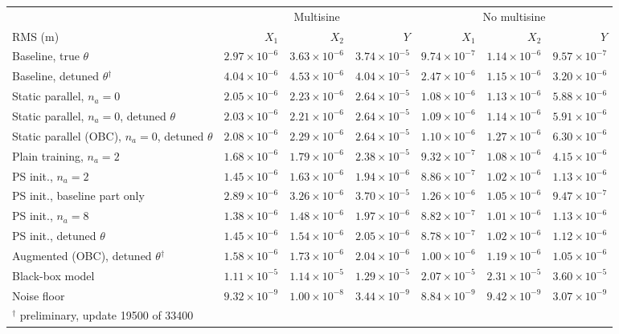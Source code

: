 \setlength{\tabcolsep}{3pt}
\begin{tabular}{l r r r r r r}
\toprule
 & \multicolumn{3}{c}{Multisine} & \multicolumn{3}{c}{No multisine}\\
\cmidrule(lr){2-4}\cmidrule(lr){5-7}
RMS (m) & $X_1$ & $X_2$ & $Y$ & $X_1$ & $X_2$ & $Y$\\
\midrule
Baseline, true $\theta$ & $2.97\times10^{-6}$ & $3.63\times10^{-6}$ & $3.74\times10^{-5}$ & $9.74\times10^{-7}$ & $1.14\times10^{-6}$ & $9.57\times10^{-7}$\\
Baseline, detuned $\theta$$^\dagger$ & $4.04\times10^{-6}$ & $4.53\times10^{-6}$ & $4.04\times10^{-5}$ & $2.47\times10^{-6}$ & $1.15\times10^{-6}$ & $3.20\times10^{-6}$\\
Static parallel, $n_a{=}0$ & $2.05\times10^{-6}$ & $2.23\times10^{-6}$ & $2.64\times10^{-5}$ & $1.08\times10^{-6}$ & $1.13\times10^{-6}$ & $5.88\times10^{-6}$\\
Static parallel, $n_a{=}0$, detuned $\theta$ & $2.03\times10^{-6}$ & $2.21\times10^{-6}$ & $2.64\times10^{-5}$ & $1.09\times10^{-6}$ & $1.14\times10^{-6}$ & $5.91\times10^{-6}$\\
Static parallel (OBC), $n_a{=}0$, detuned $\theta$ & $2.08\times10^{-6}$ & $2.29\times10^{-6}$ & $2.64\times10^{-5}$ & $1.10\times10^{-6}$ & $1.27\times10^{-6}$ & $6.30\times10^{-6}$\\
Plain training, $n_a{=}2$ & $1.68\times10^{-6}$ & $1.79\times10^{-6}$ & $2.38\times10^{-5}$ & $9.32\times10^{-7}$ & $1.08\times10^{-6}$ & $4.15\times10^{-6}$\\
PS init., $n_a{=}2$ & $1.45\times10^{-6}$ & $1.63\times10^{-6}$ & $1.94\times10^{-6}$ & $8.86\times10^{-7}$ & $1.02\times10^{-6}$ & $1.13\times10^{-6}$\\
PS init., baseline part only & $2.89\times10^{-6}$ & $3.26\times10^{-6}$ & $3.70\times10^{-5}$ & $1.26\times10^{-6}$ & $1.05\times10^{-6}$ & $9.47\times10^{-7}$\\
PS init., $n_a{=}8$ & $1.38\times10^{-6}$ & $1.48\times10^{-6}$ & $1.97\times10^{-6}$ & $8.82\times10^{-7}$ & $1.01\times10^{-6}$ & $1.13\times10^{-6}$\\
PS init., detuned $\theta$ & $1.45\times10^{-6}$ & $1.54\times10^{-6}$ & $2.05\times10^{-6}$ & $8.78\times10^{-7}$ & $1.02\times10^{-6}$ & $1.12\times10^{-6}$\\
\midrule
Augmented (OBC), detuned $\theta$$^\dagger$ & $1.58\times10^{-6}$ & $1.73\times10^{-6}$ & $2.04\times10^{-6}$ & $1.00\times10^{-6}$ & $1.19\times10^{-6}$ & $1.05\times10^{-6}$\\
\midrule
Black-box model & $1.11\times10^{-5}$ & $1.14\times10^{-5}$ & $1.29\times10^{-5}$ & $2.07\times10^{-5}$ & $2.31\times10^{-5}$ & $3.60\times10^{-5}$\\
\midrule
Noise floor & $9.32\times10^{-9}$ & $1.00\times10^{-8}$ & $3.44\times10^{-9}$ & $8.84\times10^{-9}$ & $9.42\times10^{-9}$ & $3.07\times10^{-9}$\\
\bottomrule
\multicolumn{7}{l}{\footnotesize $^\dagger$ preliminary, update 19500 of 33400}\\
\end{tabular}

